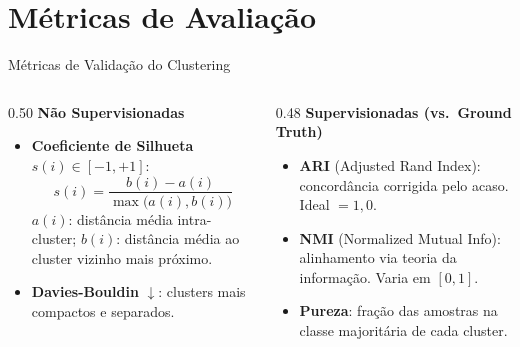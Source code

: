 \documentclass[aspectratio=169]{beamer}
\begin{document}
\section{Métricas de Avaliação}
\begin{frame}{Métricas de Validação do Clustering}
  \begin{columns}[T]
    \begin{column}{0.50\textwidth}
      \textbf{\color{ufrnblue}Não Supervisionadas}
      \begin{itemize}
        \item \textbf{Coeficiente de Silhueta} $s(i)\in[-1,+1]$:
        \[ s(i) = \frac{b(i)-a(i)}{\max\bigl(a(i),b(i)\bigr)} \]
        $a(i)$: distância média intra-cluster; $b(i)$: distância média
        ao cluster vizinho mais próximo.
        \item \textbf{Davies-Bouldin} $\downarrow$: clusters mais
              compactos e separados.
      \end{itemize}
    \end{column}
    \begin{column}{0.48\textwidth}
      \textbf{\color{ufrnblue}Supervisionadas (vs.\ Ground Truth)}
      \begin{itemize}
        \item \textbf{ARI} (Adjusted Rand Index): concordância
              corrigida pelo acaso. Ideal $=1{,}0$.
        \item \textbf{NMI} (Normalized Mutual Info): alinhamento
              via teoria da informação. Varia em $[0,1]$.
        \item \textbf{Pureza}: fração das amostras na classe majoritária
              de cada cluster.
      \end{itemize}
    \end{column}
  \end{columns}
\end{frame}

\end{document}

